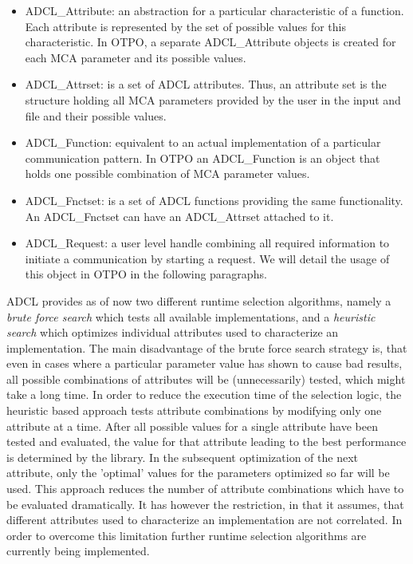 \begin{itemize}
\item ADCL\_Attribute: an abstraction for a particular
  characteristic of a function. Each attribute is represented by the set of 
  possible values for this characteristic. In OTPO, a separate ADCL\_Attribute
  objects is created for each MCA parameter and its possible  values.
\item ADCL\_Attrset: is a set of ADCL attributes. Thus, an 
  attribute set is the structure holding all MCA parameters provided by the user in the input
  and file and their possible values.
\item ADCL\_Function: equivalent to an actual implementation
  of a particular communication pattern. In OTPO an ADCL\_Function is an
  object that holds one possible combination of MCA parameter values.
\item ADCL\_Fnctset: is a set of ADCL functions providing the same
	functionality. An ADCL\_Fnctset can have an ADCL\_Attrset attached to it. 
\item ADCL\_Request: a user level handle combining all required information to initiate a 
	communication by starting a request. We will detail the usage of this object in OTPO  
  in the following paragraphs. 
\end{itemize}

ADCL provides as of now two different runtime selection algorithms, namely a {\it brute force search} which tests all available implementations, and a {\it heuristic search} which optimizes individual attributes used to characterize an implementation. The main disadvantage of the brute force search strategy is, that even in cases where a particular parameter value has shown to cause bad results, all possible combinations of attributes will be (unnecessarily) tested, which might take a long time. In order to reduce the execution time of the selection logic, the heuristic based approach tests attribute combinations by modifying only one attribute at a time. After all possible values for a single attribute have been tested and evaluated, the value for that attribute leading to the best performance is determined by the library. In the subsequent optimization of the next attribute, only the 'optimal' values for the parameters optimized so far will be used. This approach reduces the number of attribute combinations which have to be evaluated dramatically. It has however the restriction, in that it assumes, that different attributes used to characterize an implementation are not correlated. In order to overcome this limitation further runtime selection algorithms are currently being implemented.

